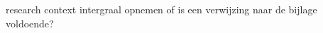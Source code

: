 \graphicspath{ {../05-research-context/} }

\begin{tcolorbox}[colback=yellow!30]
  research context intergraal opnemen of is een verwijzing naar de bijlage voldoende?
\end{tcolorbox}





